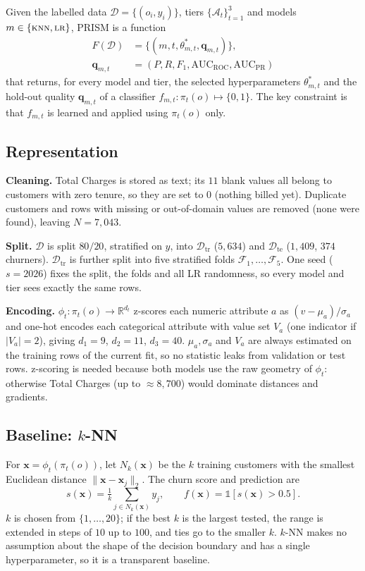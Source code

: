 \documentclass[sigconf,nonacm]{acmart}
\newcommand{\R}{\mathbb{R}}
\newcommand{\Dtr}{\mathcal{D}_{\mathrm{tr}}}
\newcommand{\Dte}{\mathcal{D}_{\mathrm{te}}}
\begin{document}
Given the labelled data $\mathcal{D}=\{(o_i,y_i)\}$, tiers $\{\mathcal{A}_t\}_{t=1}^{3}$ and models $m\in\{\textsc{knn},\textsc{lr}\}$, PRISM is a function
\begin{align*}
F(\mathcal{D})&=\big\{(m,t,\theta^*_{m,t},\mathbf{q}_{m,t})\big\},\\
\mathbf{q}_{m,t}&=(P,R,F_1,\mathrm{AUC}_{\mathrm{ROC}},\mathrm{AUC}_{\mathrm{PR}})
\end{align*}
that returns, for every model and tier, the selected hyperparameters $\theta^*_{m,t}$ and the hold-out quality $\mathbf{q}_{m,t}$ of a classifier $f_{m,t}:\pi_t(o)\mapsto\{0,1\}$. The key constraint is that $f_{m,t}$ is learned and applied using $\pi_t(o)$ only.

\subsection{Representation}
\textbf{Cleaning.} Total Charges is stored as text; its $11$ blank values all belong to customers with zero tenure, so they are set to $0$ (nothing billed yet). Duplicate customers and rows with missing or out-of-domain values are removed (none were found), leaving $N=7{,}043$.

\textbf{Split.} $\mathcal{D}$ is split $80/20$, stratified on $y$, into $\Dtr$ ($5{,}634$) and $\Dte$ ($1{,}409$, $374$ churners). $\Dtr$ is further split into five stratified folds $\mathcal{F}_1,\dots,\mathcal{F}_5$. One seed ($s=2026$) fixes the split, the folds and all LR randomness, so every model and tier sees exactly the same rows.

\textbf{Encoding.} $\phi_t:\pi_t(o)\to\R^{d_t}$ z-scores each numeric attribute $a$ as $(v-\mu_a)/\sigma_a$ and one-hot encodes each categorical attribute with value set $V_a$ (one indicator if $|V_a|=2$), giving $d_1=9$, $d_2=11$, $d_3=40$. $\mu_a,\sigma_a$ and $V_a$ are always estimated on the training rows of the current fit, so no statistic leaks from validation or test rows. z-scoring is needed because both models use the raw geometry of $\phi_t$: otherwise Total Charges (up to $\approx8{,}700$) would dominate distances and gradients.

\subsection{Baseline: $k$-NN}
For $\mathbf{x}=\phi_t(\pi_t(o))$, let $N_k(\mathbf{x})$ be the $k$ training customers with the smallest Euclidean distance $\lVert\mathbf{x}-\mathbf{x}_j\rVert_2$. The churn score and prediction are
\begin{equation*}
s(\mathbf{x})=\tfrac{1}{k}\textstyle\sum_{j\in N_k(\mathbf{x})}y_j,\qquad f(\mathbf{x})=\mathbb{1}[s(\mathbf{x})>0.5].
\end{equation*}
$k$ is chosen from $\{1,\dots,20\}$; if the best $k$ is the largest tested, the range is extended in steps of $10$ up to $100$, and ties go to the smaller $k$. $k$-NN makes no assumption about the shape of the decision boundary and has a single hyperparameter, so it is a transparent baseline.
\end{document}
